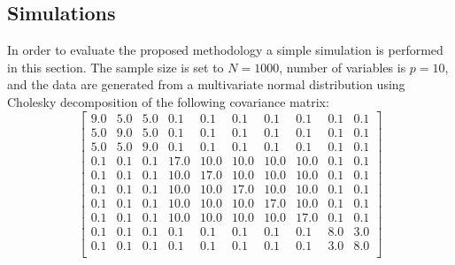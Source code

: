 \documentclass[11pt,a5paper,twoside]{book}
\begin{document}
\subsection{Simulations}
\label{mifasec_sim}
In order to evaluate the proposed methodology a simple simulation is performed in this section. The sample size is set to $N=1000$, number of variables is $p=10$, and the data are generated from a multivariate normal distribution using Cholesky decomposition of the following covariance matrix:
$$\begin{bmatrix}{}
  9.0 & 5.0 & 5.0 & 0.1 & 0.1 & 0.1 & 0.1 & 0.1 & 0.1 & 0.1 \\ 
  5.0 & 9.0 & 5.0 & 0.1 & 0.1 & 0.1 & 0.1 & 0.1 & 0.1 & 0.1 \\ 
  5.0 & 5.0 & 9.0 & 0.1 & 0.1 & 0.1 & 0.1 & 0.1 & 0.1 & 0.1 \\ 
  0.1 & 0.1 & 0.1 & 17.0 & 10.0 & 10.0 & 10.0 & 10.0 & 0.1 & 0.1 \\ 
  0.1 & 0.1 & 0.1 & 10.0 & 17.0 & 10.0 & 10.0 & 10.0 & 0.1 & 0.1 \\ 
  0.1 & 0.1 & 0.1 & 10.0 & 10.0 & 17.0 & 10.0 & 10.0 & 0.1 & 0.1 \\ 
  0.1 & 0.1 & 0.1 & 10.0 & 10.0 & 10.0 & 17.0 & 10.0 & 0.1 & 0.1 \\ 
  0.1 & 0.1 & 0.1 & 10.0 & 10.0 & 10.0 & 10.0 & 17.0 & 0.1 & 0.1 \\ 
  0.1 & 0.1 & 0.1 & 0.1 & 0.1 & 0.1 & 0.1 & 0.1 & 8.0 & 3.0 \\ 
  0.1 & 0.1 & 0.1 & 0.1 & 0.1 & 0.1 & 0.1 & 0.1 & 3.0 & 8.0 \\ 
  \end{bmatrix}$$
\end{document}
